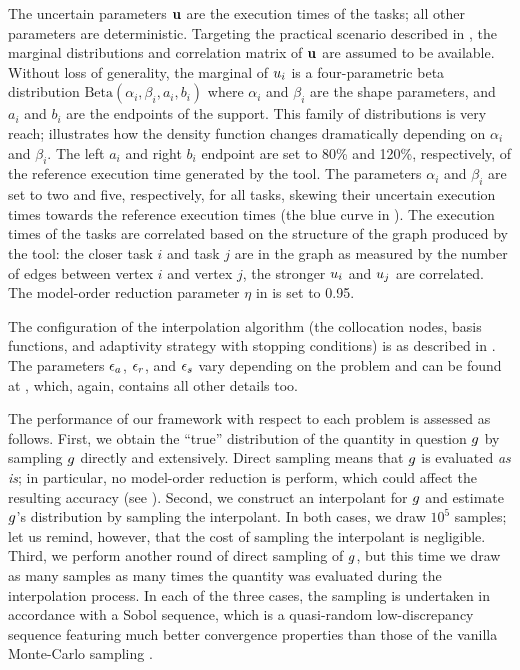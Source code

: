 
The uncertain parameters $\mathbf{u}$ are the execution times of the tasks; all other
parameters are deterministic. Targeting the practical scenario described in
, the marginal distributions and correlation matrix
of $\mathbf{u}$ are assumed to be available. Without loss of generality, the marginal
of $u_i$ is a four-parametric beta distribution $\text{Beta}(\alpha_i, \beta_i,
a_i, b_i)$ where $\alpha_i$ and $\beta_i$ are the shape parameters, and $a_i$
and $b_i$ are the endpoints of the support. This family of distributions is very
reach;  illustrates how the density function changes
dramatically depending on $\alpha_i$ and $\beta_i$. The left $a_i$ and right
$b_i$ endpoint are set to 80\% and 120\%, respectively, of the reference
execution time generated by the  tool. The parameters $\alpha_i$ and
$\beta_i$ are set to two and five, respectively, for all tasks, skewing their
uncertain execution times towards the reference execution times (the blue curve
in ). The execution times of the tasks are correlated based
on the structure of the graph produced by the  tool: the closer task
$i$ and task $j$ are in the graph as measured by the number of edges between
vertex $i$ and vertex $j$, the stronger $u_i$ and $u_j$ are correlated. The
model-order reduction parameter $\eta$ in  is set to 0.95.

The configuration of the interpolation algorithm (the collocation nodes, basis
functions, and adaptivity strategy with stopping conditions) is as described in
. The parameters $\epsilon_a$, $\epsilon_r$, and $\epsilon_s$ vary
depending on the problem and can be found at \cite{sources}, which, again,
contains all other details too.

The performance of our framework with respect to each problem is assessed as
follows. First, we obtain the ``true'' distribution of the quantity in question
$g$ by sampling $g$ directly and extensively. Direct sampling means that $g$
is evaluated \emph{as is}; in particular, no model-order reduction is perform,
which could affect the resulting accuracy (see ).
Second, we construct an interpolant for $g$ and estimate $g$'s distribution by
sampling the interpolant. In both cases, we draw $10^5$ samples; let us remind,
however, that the cost of sampling the interpolant is negligible. Third, we
perform another round of direct sampling of $g$, but this time we draw as many
samples as many times the quantity was evaluated during the interpolation
process. In each of the three cases, the sampling is undertaken in accordance
with a Sobol sequence, which is a quasi-random low-discrepancy sequence
featuring much better convergence properties than those of the vanilla
Monte-Carlo sampling \cite{joe2008}.

